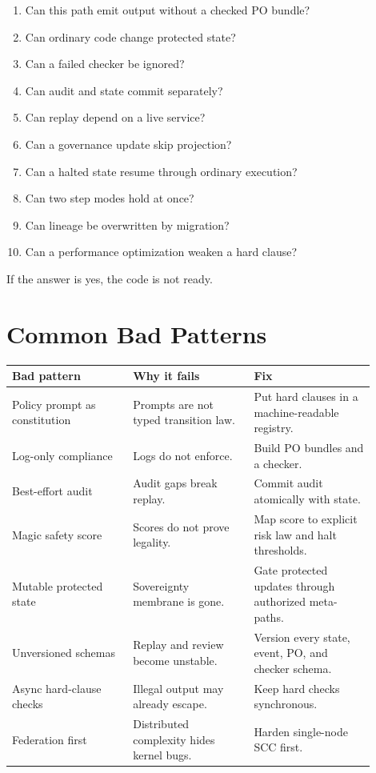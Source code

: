 \documentclass[11pt,oneside]{article}
\begin{document}
\begin{enumerate}
\item Can this path emit output without a checked PO bundle?
\item Can ordinary code change protected state?
\item Can a failed checker be ignored?
\item Can audit and state commit separately?
\item Can replay depend on a live service?
\item Can a governance update skip projection?
\item Can a halted state resume through ordinary execution?
\item Can two step modes hold at once?
\item Can lineage be overwritten by migration?
\item Can a performance optimization weaken a hard clause?
\end{enumerate}

If the answer is yes, the code is not ready.

\section{Common Bad Patterns}
\begin{longtable}{@{}p{0.30\linewidth}p{0.30\linewidth}p{0.30\linewidth}@{}}
\toprule
\textbf{Bad pattern} & \textbf{Why it fails} & \textbf{Fix} \\
\midrule
Policy prompt as constitution & Prompts are not typed transition law. & Put hard clauses in a machine-readable registry. \\
Log-only compliance & Logs do not enforce. & Build PO bundles and a checker. \\
Best-effort audit & Audit gaps break replay. & Commit audit atomically with state. \\
Magic safety score & Scores do not prove legality. & Map score to explicit risk law and halt thresholds. \\
Mutable protected state & Sovereignty membrane is gone. & Gate protected updates through authorized meta-paths. \\
Unversioned schemas & Replay and review become unstable. & Version every state, event, PO, and checker schema. \\
Async hard-clause checks & Illegal output may already escape. & Keep hard checks synchronous. \\
Federation first & Distributed complexity hides kernel bugs. & Harden single-node SCC first. \\
\bottomrule
\end{longtable}
\end{document}
